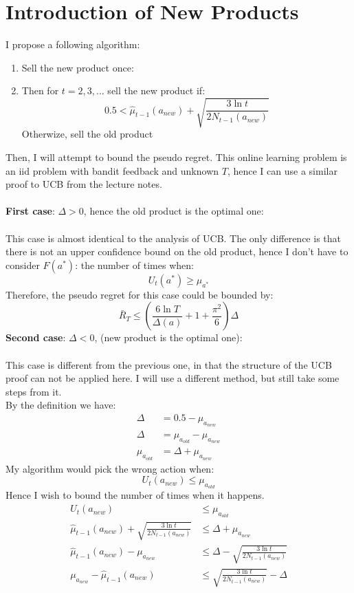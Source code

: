 \documentclass[a4paper]{article}
\begin{document}
\section{Introduction of New Products}
\label{sec:3}
I propose a following algorithm:
\begin{enumerate}
\item Sell the new product once:
\item Then for $t=2,3,...$ sell the new product if:
  \[
  0.5 <\hat{\mu}_{t-1}(a_{new})+\sqrt{\frac{3 \ln t}{2 N_{t-1}(a_{new})}}
  \]
  Otherwize, sell the old product
\end{enumerate}
Then, I will attempt to bound the pseudo regret. This online learning problem is
an iid problem with bandit feedback and unknown $T$, hence I can use a similar
proof to UCB from the lecture notes.\\\\
\textbf{First case}: $\Delta > 0$, hence the old product is the optimal
one:\\\\
This case is almost identical to the analysis of UCB. The only difference is
that there is not an upper confidence bound on the old product, hence I don't
have to consider $F(a^*)$: the number of times when:
\[
U_t(a^*) \geq \mu_{a^*}
\]
Therefore, the pseudo regret for this case could be bounded by:
\[
\bar{R}_{T} \leq \left( \frac{6\ln
  T}{\Delta(a)}+1+\frac{\pi^{2}}{6}\right)\Delta
\]
\textbf{Second case}: $\Delta < 0$, (new product is the optimal one):\\\\
This case is different from the previous one, in that the structure of the UCB
proof can not be applied here. I will use a different method, but still take
some steps from it.\\
By the definition we have:
\begin{align*}
  \Delta &= 0.5 - \mu_{a_{new}}\\
  \Delta &= \mu_{a_{old}} - \mu_{a_{new}}\\
  \mu_{a_{old}} &= \Delta + \mu_{a_{new}}
\end{align*}
My algorithm would pick the wrong action when:
\[
U_t(a_{new}) \leq \mu_{a_{old}}
\]
Hence I wish to bound the number of times when it happens.
\begin{align*}
U_t(a_{new}) &\leq \mu_{a_{old}}\\
\hat{\mu}_{t-1}(a_{new})+ \sqrt{\frac{3 \ln t}{2 N_{t-1}(a_{new})}}
&\leq \Delta + \mu_{a_{new}}\\
\hat{\mu}_{t-1}(a_{new}) -  \mu_{a_{new}}
&\leq \Delta -
\sqrt{\frac{3 \ln t}{2 N_{t-1}(a_{new})}}\\
 \mu_{a_{new}}-\hat{\mu}_{t-1}(a_{new})  
&\leq \sqrt{\frac{3 \ln t}{2 N_{t-1}(a_{new})}} - \Delta
\end{align*}
\end{document}
